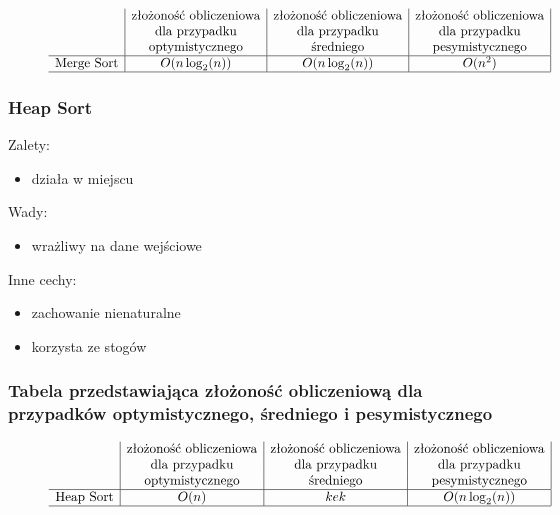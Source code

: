\documentclass[polish,polish,a4paper]{article}
\begin{document}
\begin{spacing}{1.5}
\begin{figure}[H]
\begin{equation*}
\begin{array}{l|c|c|c|}
		&$złożoność obliczeniowa$&$złożoność obliczeniowa$&$złożoność obliczeniowa$\\
		&$dla przypadku$&$dla przypadku$&$dla przypadku$\\
		&$optymistycznego$&$średniego$&$pesymistycznego$\\
		\hline
		$Merge Sort$&O(n\log_{2}(n))&O(n\log_{2}(n))&O(n^2)\\
		\hline
		\end{array}
		\end{equation*}
	\end{figure}
	
			\subsubsection*{Heap Sort}
Zalety:
\begin{itemize}
	\item działa w miejscu
\end{itemize}
Wady:
\begin{itemize}
	\item wrażliwy na dane wejściowe
\end{itemize}
Inne cechy:
\begin{itemize}
	\item zachowanie nienaturalne
	\item korzysta ze stogów
\end{itemize}

\subsubsection*{Tabela przedstawiająca złożoność obliczeniową dla przypadków optymistycznego, średniego i pesymistycznego} 
\begin{figure}[H]
	
	\begin{equation*}
	\begin{array}{l|c|c|c|}

	&$złożoność obliczeniowa$&$złożoność obliczeniowa$&$złożoność obliczeniowa$\\
	&$dla przypadku$&$dla przypadku$&$dla przypadku$\\
	&$optymistycznego$&$średniego$&$pesymistycznego$\\
	\hline
	$Heap Sort$&O(n)&kek&O(n\log_{2}(n))\\
	\hline
	\end{array}
	\end{equation*}
\end{figure}


\end{spacing}
\end{document}
